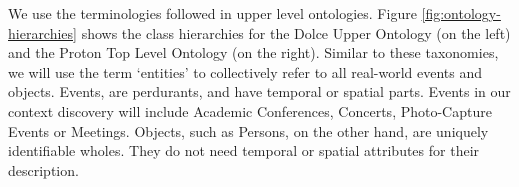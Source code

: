 We use the terminologies followed in upper level ontologies. Figure \ref{fig:ontology-hierarchies} shows the class hierarchies for the Dolce Upper Ontology (on the left) and the Proton Top Level Ontology (on the right). Similar to these taxonomies, we will use the term `entities' to collectively refer to all real-world events and objects. Events, are perdurants, and have temporal or spatial parts. Events in our context discovery will include Academic Conferences, Concerts, Photo-Capture Events or Meetings. Objects, such as Persons, on the other hand, are uniquely identifiable wholes. They do not need temporal or spatial attributes for their description.


